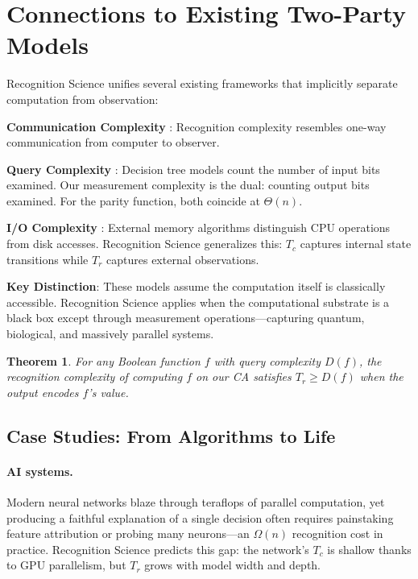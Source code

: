 \documentclass[11pt]{article}
\theoremstyle{plain}
\newtheorem{theorem}{Theorem}
\theoremstyle{definition}
\theoremstyle{remark}
\begin{document}
\section{Connections to Existing Two-Party Models}

Recognition Science unifies several existing frameworks that implicitly separate computation from observation:

\textbf{Communication Complexity} \cite{yao1977probabilistic,kushilevitz1997communication}: Recognition complexity resembles one-way communication from computer to observer.

\textbf{Query Complexity} \cite{buhrman2002complexity}: Decision tree models count the number of input bits examined. Our measurement complexity is the dual: counting output bits examined. For the parity function, both coincide at $\Theta(n)$.

\textbf{I/O Complexity} \cite{aggarwal1988input}: External memory algorithms distinguish CPU operations from disk accesses. Recognition Science generalizes this: $T_c$ captures internal state transitions while $T_r$ captures external observations.

\textbf{Key Distinction}: These models assume the computation itself is classically accessible. Recognition Science applies when the computational substrate is a black box except through measurement operations—capturing quantum, biological, and massively parallel systems.

\begin{theorem}
For any Boolean function $f$ with query complexity $D(f)$, the recognition complexity of computing $f$ on our CA satisfies $T_r \geq D(f)$ when the output encodes $f$'s value.
\end{theorem}

\subsection{Case Studies: From Algorithms to Life}

\paragraph{AI systems.}  Modern neural networks blaze through teraflops of parallel computation, yet producing a faithful explanation of a single decision often requires painstaking feature attribution or probing many neurons---an \(\Omega(n)\) recognition cost in practice.  Recognition Science predicts this gap: the network's $T_c$ is shallow thanks to GPU parallelism, but $T_r$ grows with model width and depth.
\end{document}
